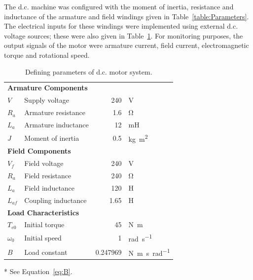 \documentclass[a4paper,11pt,twocolumn]{article}
\newcommand{\V}{\si{\volt}\xspace}
\newcommand{\Ohm}{\si{\ohm}\xspace}
\renewcommand{\H}{\si{\henry}\xspace}
\newcommand{\mH}{\si{\milli\henry}\xspace}
\newcommand{\Nm}{\si{\newton\metre}\xspace}
\newcommand{\rps}{\si{\radian\per\second}\xspace}
\newcommand{\kgmm}{\si{\kilogram\square\metre}\xspace}
\newcommand{\Nmspr}{\si{\newton\metre\second\per\radian}\xspace}
\newcommand{\DC}{d.c.\xspace}
\begin{document}
The \DC machine was configured with the moment of inertia, resistance and 
inductance of the armature and field windings given in 
Table~\vref{table:Parameters}. The electrical inputs for these windings were 
implemented using external \DC voltage sources; these were also given in 
Table~\ref{table:Parameters}. For monitoring purposes, the output signals of 
the motor were armature current, field current, electromagnetic torque and 
rotational speed.
\begin{table}[h]
    \centering
    \footnotesize
    \begin{threeparttable}
        \caption{Defining parameters of \DC motor system.\vspace{-1em}}
        \label{table:Parameters}
        \begin{tabular}{@{}llrl@{}}
            \toprule
            \multicolumn{4}{l}{\textbf{Armature Components}} \\
            \hspace{1em}$V$   & Supply voltage      & 240 & \V \\
            \hspace{1em}$R_a$ & Armature resistance & 1.6 & \Ohm \\
            \hspace{1em}$L_a$ & Armature inductance &  12 & \mH \\
            \hspace{1em}$J$   & Moment of inertia   & 0.5 & \kgmm \\
            \midrule
            \multicolumn{4}{l}{\textbf{Field Components}} \\
            \hspace{1em}$V_f$    & Field voltage       &  240 & \V \\
            \hspace{1em}$R_a$    & Field resistance    &  240 & \Ohm \\
            \hspace{1em}$L_a$    & Field inductance    &  120 & \H \\
            \hspace{1em}$L_{af}$ & Coupling inductance & 1.65 & \H \\
            \midrule
            \multicolumn{4}{l}{\textbf{Load Characteristics}} \\
            \hspace{1em}$T_{e0}$   & Initial torque         & 45       & \Nm \\
            \hspace{1em}$\omega_0$ & Initial speed          &  1       & \rps \\
            \hspace{1em}$B$        & Load constant\tnote{*} & 0.247969 & \Nmspr 
            \\
            \bottomrule
        \end{tabular}
        \begin{tablenotes}
            \item[*]See Equation~\vref{eq:B}.
        \end{tablenotes}
    \end{threeparttable}
\end{table}
\end{document}
